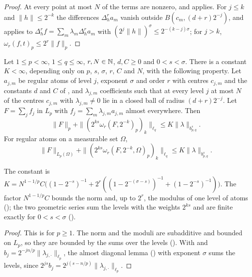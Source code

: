 \begin{proof}
\leanok
At every point at most $N$ of the terms are nonzero, and  applies. For
$j \leq k$ and $\|h\| \leq 2^{-k}$ the differences $\Delta_h^r a_m$ vanish outside
$B(c_m, (d + r) 2^{-j})$, and  applies to
$\Delta_h^r f = \sum_m \lambda_m \Delta_h^r a_m$ with $(2^j \|h\|)^\sigma \leq 2^{-(k-j)\sigma}$; for
$j > k$, $\omega_r(f, t)_p \leq 2^r \|f\|_p$.
\end{proof}

\begin{theorem}
\label{thm:rd-atomic-synthesis}
\leanok
{}
Let $1 \leq p < \infty$, $1 \leq q \leq \infty$, $r, N \in \mathbb{N}$, $d, C \geq 0$ and
$0 < s < \sigma$. There is a constant $K < \infty$, depending only on $p$, $s$, $\sigma$, $r$, $C$
and $N$, with the following property. Let $a_{j,m}$ be regular atoms of level $j$, exponent
$\sigma$ and order $r$ with centres $c_{j,m}$ and the constants $d$ and $C$ of
, and $\lambda_{j,m}$ coefficients such that at every level $j$ at most
$N$ of the centres $c_{j,m}$ with $\lambda_{j,m} \neq 0$ lie in a closed ball of radius
$(d + r) 2^{-j}$. Let $F = \sum_j f_j$ in $L_p$ with $f_j = \sum_m \lambda_{j,m} a_{j,m}$ almost
everywhere. Then
\[
  \|F\|_p + \|(2^{ks} \omega_r(F, 2^{-k})_p)_k\|_{\ell_q} \leq K \|\lambda\|_{b^s_{p,q}} .
\]
For regular atoms on a measurable set $\Omega$,
\[
  \|F\|_{L_p(\Omega)} + \|(2^{ks} \omega_r(F, 2^{-k}, \Omega)_p)_k\|_{\ell_q} \leq
  K \|\lambda\|_{b^s_{p,q}} .
\]
\end{theorem}

The constant is
$K = N^{1-1/p} C \bigl((1 - 2^{-s})^{-1} + 2^r ((1 - 2^{-(\sigma - s)})^{-1} +
(1 - 2^{-s})^{-1})\bigr)$. The factor $N^{1-1/p} C$ bounds the norm and, up to $2^r$, the modulus of
one level of atoms (); the two geometric series sum the levels with the
weights $2^{ks}$ and are finite exactly for $0 < s < \sigma$ ().

\begin{proof}
\leanok
This is \cite[Theorem 2.6 and Corollary 2.8, direction $\Leftarrow$]{SchneiderVybiral} for
$p \geq 1$. The norm and the moduli are subadditive and bounded on $L_p$, so they are bounded by the
sums over the levels (). With  and $b_j =
2^{-jn/p} \|\lambda_{j,\cdot}\|_{\ell_p}$, the almost diagonal lemma ()
with exponent $\sigma$ sums the levels, since $2^{js} b_j = 2^{j(s - n/p)}
\|\lambda_{j,\cdot}\|_{\ell_p}$.
\end{proof}


